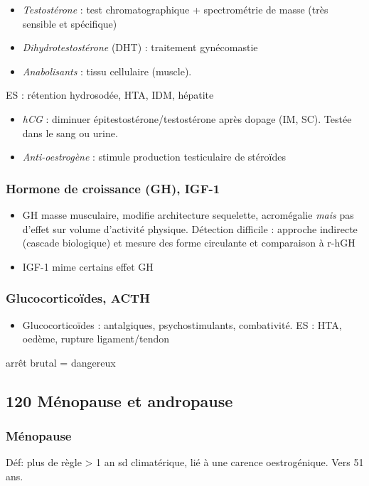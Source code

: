 \documentclass[11pt]{article}
\begin{document}
\vspace*{0.5cm}
\begin{itemize}
\item \emph{Testostérone} : test chromatographique + spectrométrie de masse (très sensible
et spécifique)
\item \emph{Dihydrotestostérone} (DHT) : traitement gynécomastie
\item \emph{Anabolisants} : \inc tissu cellulaire (muscle).
\end{itemize}
ES : rétention hydrosodée, HTA, IDM, hépatite
\begin{itemize}
\item \emph{hCG} : diminuer épitestostérone/testostérone après dopage (IM, SC). Testée dans
le sang ou urine.
\item \emph{Anti-oestrogène} : stimule production testiculaire de stéroïdes
\end{itemize}

\subsubsection{Hormone de croissance (GH), IGF-1}
\label{sec:orgf49661a}
\begin{itemize}
\item GH \inc masse musculaire, modifie architecture sequelette, acromégalie \emph{mais}
pas d'effet sur volume d'activité physique. Détection difficile : approche
indirecte (cascade biologique) et mesure des forme circulante et comparaison à r-hGH
\item IGF-1 mime certains effet GH
\end{itemize}

\subsubsection{Glucocorticoïdes, ACTH}
\label{sec:orgb3b0968}
\begin{itemize}
\item Glucocorticoïdes : antalgiques, psychostimulants, combativité. ES : HTA,
oedème, rupture ligament/tendon
\end{itemize}
\danger arrêt brutal = dangereux \faBomb

\subsection{120 \textdagger{} Ménopause et andropause}
\label{sec:orgb54eef3}
\label{sec:120}
\subsubsection{Ménopause}
\label{sec:org6997900}
Déf: plus de règle > 1 an \textpm{} sd climatérique, lié à une carence
oestrogénique. Vers 51 ans.
\end{document}
